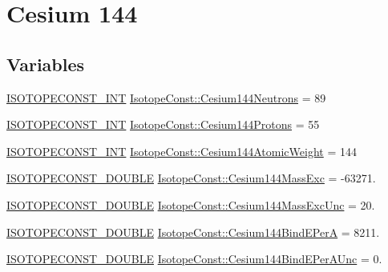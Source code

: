 \hypertarget{group___isotope_const-_cesium-_cs144}{}\section{Cesium 144}
\label{group___isotope_const-_cesium-_cs144}
\subsection*{Variables}
\begin{DoxyCompactItemize}
\item 
\mbox{\hyperlink{group___isotope_const-_macros_ga5f18360b3e99483a35c32d789e62621c}{I\+S\+O\+T\+O\+P\+E\+C\+O\+N\+S\+T\+\_\+\+I\+NT}} \mbox{\hyperlink{group___isotope_const-_cesium-_cs144_ga0a42b82a62a7160cf5a3705dc9243891}{Isotope\+Const\+::\+Cesium144\+Neutrons}} = 89
\item 
\mbox{\hyperlink{group___isotope_const-_macros_ga5f18360b3e99483a35c32d789e62621c}{I\+S\+O\+T\+O\+P\+E\+C\+O\+N\+S\+T\+\_\+\+I\+NT}} \mbox{\hyperlink{group___isotope_const-_cesium-_cs144_ga336eaea34825fe7bd0922b61d59952c4}{Isotope\+Const\+::\+Cesium144\+Protons}} = 55
\item 
\mbox{\hyperlink{group___isotope_const-_macros_ga5f18360b3e99483a35c32d789e62621c}{I\+S\+O\+T\+O\+P\+E\+C\+O\+N\+S\+T\+\_\+\+I\+NT}} \mbox{\hyperlink{group___isotope_const-_cesium-_cs144_ga5e0608e05f7b862730a642dd029121a8}{Isotope\+Const\+::\+Cesium144\+Atomic\+Weight}} = 144
\item 
\mbox{\hyperlink{group___isotope_const-_macros_ga8f45a7272ce02c0b4c65c44636ed719a}{I\+S\+O\+T\+O\+P\+E\+C\+O\+N\+S\+T\+\_\+\+D\+O\+U\+B\+LE}} \mbox{\hyperlink{group___isotope_const-_cesium-_cs144_ga4aca6578a5ff2fbad78aa00d9905f16e}{Isotope\+Const\+::\+Cesium144\+Mass\+Exc}} = -\/63271.
\item 
\mbox{\hyperlink{group___isotope_const-_macros_ga8f45a7272ce02c0b4c65c44636ed719a}{I\+S\+O\+T\+O\+P\+E\+C\+O\+N\+S\+T\+\_\+\+D\+O\+U\+B\+LE}} \mbox{\hyperlink{group___isotope_const-_cesium-_cs144_gaacbcdc5a76ebca29e77b242f4b3e444f}{Isotope\+Const\+::\+Cesium144\+Mass\+Exc\+Unc}} = 20.
\item 
\mbox{\hyperlink{group___isotope_const-_macros_ga8f45a7272ce02c0b4c65c44636ed719a}{I\+S\+O\+T\+O\+P\+E\+C\+O\+N\+S\+T\+\_\+\+D\+O\+U\+B\+LE}} \mbox{\hyperlink{group___isotope_const-_cesium-_cs144_ga3b58af19813b494c3373c0fc5c058797}{Isotope\+Const\+::\+Cesium144\+Bind\+E\+PerA}} = 8211.
\item 
\mbox{\hyperlink{group___isotope_const-_macros_ga8f45a7272ce02c0b4c65c44636ed719a}{I\+S\+O\+T\+O\+P\+E\+C\+O\+N\+S\+T\+\_\+\+D\+O\+U\+B\+LE}} \mbox{\hyperlink{group___isotope_const-_cesium-_cs144_ga05c519b013721a9d72809e5ed6415448}{Isotope\+Const\+::\+Cesium144\+Bind\+E\+Per\+A\+Unc}} = 0.

\end{DoxyCompactItemize}
